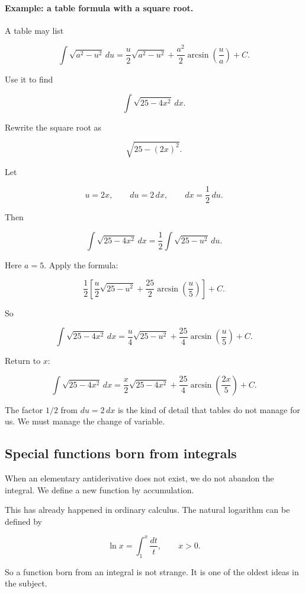 \paragraph{Example: a table formula with a square root.}
A table may list

\[
\int \sqrt{a^2-u^2}\,du
=
\frac{u}{2}\sqrt{a^2-u^2}
+
\frac{a^2}{2}\arcsin\left(\frac{u}{a}\right)
+C.
\]

Use it to find

\[
\int \sqrt{25-4x^2}\,dx.
\]

Rewrite the square root as

\[
\sqrt{25-(2x)^2}.
\]

Let

\[
u=2x,
\qquad
du=2\,dx,
\qquad
dx=\frac12\,du.
\]

Then

\[
\int \sqrt{25-4x^2}\,dx
=
\frac12\int \sqrt{25-u^2}\,du.
\]

Here \(a=5\).  Apply the formula:

\[
\frac12\left[
\frac{u}{2}\sqrt{25-u^2}
+
\frac{25}{2}\arcsin\left(\frac{u}{5}\right)
\right]+C.
\]

So

\[
\int \sqrt{25-4x^2}\,dx
=
\frac{u}{4}\sqrt{25-u^2}
+
\frac{25}{4}\arcsin\left(\frac{u}{5}\right)
+C.
\]

Return to \(x\):

\[
\boxed{
\int \sqrt{25-4x^2}\,dx
=
\frac{x}{2}\sqrt{25-4x^2}
+
\frac{25}{4}\arcsin\left(\frac{2x}{5}\right)
+C.
}
\]

The factor \(1/2\) from \(du=2\,dx\) is the kind of detail that tables do not manage for
us.  We must manage the change of variable.

\subsection{Special functions born from integrals}
\label{subsec:special-functions-born-from-integrals}

When an elementary antiderivative does not exist, we do not abandon the integral.
We define a new function by accumulation.

This has already happened in ordinary calculus.  The natural logarithm can be defined by

\[
\ln x=\int_1^x \frac{dt}{t},
\qquad x>0.
\]

So a function born from an integral is not strange.  It is one of the oldest ideas in the
subject.

